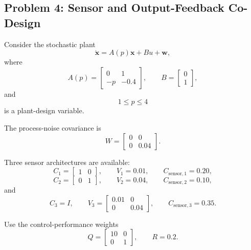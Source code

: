 \subsection*{Problem 4: Sensor and Output-Feedback Co-Design}

Consider the stochastic plant
\begin{equation}
\dot{\mathbf{x}}
=
A(p)\mathbf{x}
+
Bu
+
\mathbf{w},
\end{equation}
where
\begin{equation}
A(p)=
\begin{bmatrix}
0&1\\
-p&-0.4
\end{bmatrix},
\qquad
B=
\begin{bmatrix}
0\\
1
\end{bmatrix},
\end{equation}
and
\begin{equation}
1\leq p\leq4
\end{equation}
is a plant-design variable.

The process-noise covariance is
\begin{equation}
W=
\begin{bmatrix}
0&0\\
0&0.04
\end{bmatrix}.
\end{equation}

Three sensor architectures are available:
\begin{equation}
C_1=
\begin{bmatrix}
1&0
\end{bmatrix},
\qquad
V_1=0.01,
\qquad
C_{\mathrm{sensor},1}=0.20,
\end{equation}
\begin{equation}
C_2=
\begin{bmatrix}
0&1
\end{bmatrix},
\qquad
V_2=0.04,
\qquad
C_{\mathrm{sensor},2}=0.10,
\end{equation}
and
\begin{equation}
C_3=I,
\qquad
V_3=
\begin{bmatrix}
0.01&0\\
0&0.04
\end{bmatrix},
\qquad
C_{\mathrm{sensor},3}=0.35.
\end{equation}

Use the control-performance weights
\begin{equation}
Q=
\begin{bmatrix}
10&0\\
0&1
\end{bmatrix},
\qquad
R=0.2.
\end{equation}

